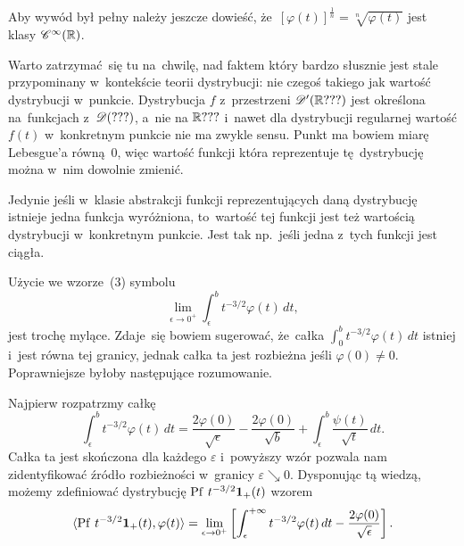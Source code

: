 \documentclass[a4paper,11pt]{article}
\numberwithin{equation}{section}
\begin{document}
\VerSpaceFour





\noindent
{} Aby wywód był pełny należy jeszcze dowieść,
że~$[ \varphi( t ) ]^{ \frac{ 1 }{ n } } = \sqrt[ n ]{ \varphi( t ) }$ jest
klasy $\mathcal{C}^{ \infty }( \mathbb{R} )$.

\VerSpaceFour





\noindent
{} Warto zatrzymać~się tu na~chwilę, nad faktem który
bardzo słusznie jest stale przypominany w~kontekście teorii
dystrybucji: nie czegoś takiego jak wartość dystrybucji w~punkcie.
Dystrybucja $f$ z~przestrzeni $\mathcal{D}'( \mathbb{R} ??? )$ jest określona
na~funkcjach z~$\mathcal{D}( ??? )$, a~nie na $\mathbb{R} ???$ i~nawet dla dystrybucji
regularnej wartość $f( t )$ w~konkretnym punkcie nie ma zwykle sensu.
Punkt ma bowiem miarę Lebesgue’a równą~0, więc wartość funkcji która
reprezentuje tę~dystrybucję można w~nim dowolnie zmienić.

Jedynie jeśli w~klasie abstrakcji funkcji reprezentujących daną
dystrybucję istnieje jedna funkcja wyróżniona, to~wartość tej funkcji
jest też wartością dystrybucji w~konkretnym punkcie. Jest tak
np.~jeśli jedna z~tych funkcji jest ciągła.

\VerSpaceFour





\noindent
{} Użycie we wzorze~(3) symbolu
\begin{equation}
  \label{eq:Zemanian-01}
  \lim_{ \epsilon \to 0^{ + } } \int_{ \epsilon }^{ b } t^{ -3 / 2 } \varphi( t ) \, dt,
\end{equation}
jest trochę mylące. Zdaje~się bowiem sugerować, że~całka
$\int_{ 0 }^{ b } t^{ -3 / 2 } \varphi( t ) \, dt$ istniej i~jest równa tej
granicy, jednak całka ta jest rozbieżna jeśli $\varphi( 0 ) \neq 0$.
Poprawniejsze byłoby następujące rozumowanie.

Najpierw rozpatrzmy całkę
\begin{equation}
  \label{eq:Zemanian-02}
  \int_{ \epsilon }^{ b } t^{ -3/2 } \varphi( t ) \, dt =
  \frac{ 2 \varphi( 0 ) }{ \sqrt{ \epsilon } } - \frac{ 2 \varphi( 0 ) }{ \sqrt{ b } }
  + \int_{ \epsilon }^{ b } \frac{ \psi( t ) }{ \sqrt{ t } } \, dt.
\end{equation}
Całka ta jest skończona dla każdego $\varepsilon$ i~powyższy wzór pozwala
nam zidentyfikować źródło rozbieżności w~granicy $\varepsilon \searrow 0$.
Dysponując tą wiedzą, możemy zdefiniować dystrybucję
$\operatorname{Pf} \, t^{ -3 / 2 } \mathbf{1}_{ + }( t )$ wzorem
\begin{equation}
  \label{eq:Zemanian-03}
  \langle \operatorname{Pf} \, t^{ -3/2 } \mathbf{1}_{ + }( t ), \varphi( t ) \rangle =
  \lim_{ \epsilon \to 0^{ + } } \left[ \int_{ \epsilon }^{ +\infty } t^{ -3/2 } \varphi( t ) \, dt
    - \frac{ 2 \varphi( 0 ) }{ \sqrt{ \epsilon } } \right].
\end{equation}
\end{document}
